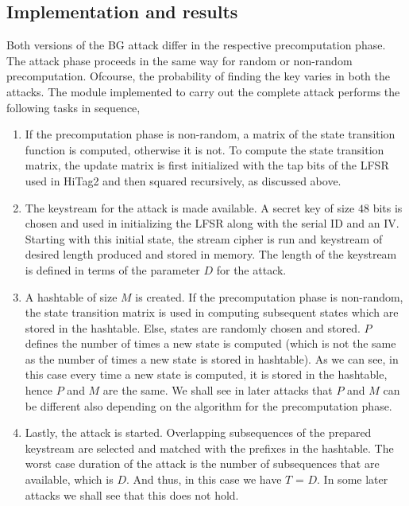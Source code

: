 \subsection{Implementation and results}

Both versions of the BG attack differ in the respective precomputation phase. The attack phase proceeds in the same way for random or non-random precomputation. Ofcourse, the probability of finding the key varies in both the attacks. The module implemented to carry out the complete attack performs the following tasks in sequence,
\begin{enumerate}
\item If the precomputation phase is non-random, a matrix of the state transition function is computed, otherwise it is not. To compute the state transition matrix, the update matrix is first initialized with the tap bits of the LFSR used in HiTag2 and then squared recursively, as discussed above.
\item The keystream for the attack is made available. A secret key of size $48$ bits is chosen and used in initializing the LFSR along with the serial ID and an IV. Starting with this initial state, the stream cipher is run and keystream of desired length produced and stored in memory. The length of the keystream is defined in terms of the parameter $D$ for the attack.
\item A hashtable of size $M$ is created. If the precomputation phase is non-random, the state transition matrix is used in computing subsequent states which are stored in the hashtable. Else, states are randomly chosen and stored. $P$ defines the number of times a new state is computed (which is not the same as the number of times a new state is stored in hashtable). As we can see, in this case every time a new state is computed, it is stored in the hashtable, hence $P$ and $M$ are the same. We shall see in later attacks that $P$ and $M$ can be different also depending on the algorithm for the precomputation phase. 
\item Lastly, the attack is started. Overlapping subsequences of the prepared keystream are selected and matched with the prefixes in the hashtable. The worst case duration of the attack is the number of subsequences that are available, which is $D$. And thus, in this case we have $T$ = $D$. In some later attacks we shall see that this does not hold. 
\end{enumerate}


